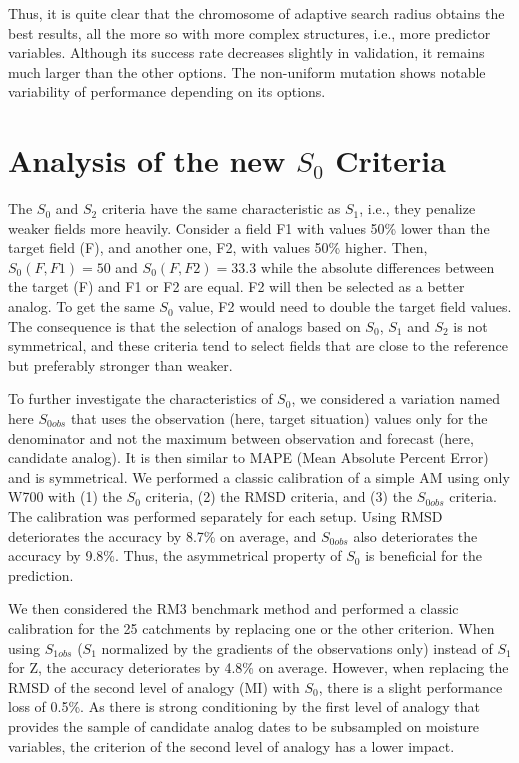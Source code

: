 \documentclass[draft]{agujournal2019}
\begin{document}
Thus, it is quite clear that the chromosome of adaptive search radius obtains the best results, all the more so with more complex structures, i.e., more predictor variables. Although its success rate decreases slightly in validation, it remains much larger than the other options. The non-uniform mutation shows notable variability of performance depending on its options.

\FloatBarrier

\section{Analysis of the new $S_{0}$ Criteria}

The $S_{0}$ and $S_{2}$ criteria have the same characteristic as $S_{1}$, i.e., they penalize weaker fields more heavily. Consider a field F1 with values 50\% lower than the target field (F), and another one, F2, with values 50\% higher. Then, $S_{0}(F, F1) = 50$ and $S_{0}(F, F2) = 33.3$ while the absolute differences between the target (F) and F1 or F2 are equal. F2 will then be selected as a better analog. To get the same $S_{0}$ value, F2 would need to double the target field values. The consequence is that the selection of analogs based on $S_{0}$, $S_{1}$ and $S_{2}$ is not symmetrical, and these criteria tend to select fields that are close to the reference but preferably stronger than weaker. 

To further investigate the characteristics of $S_{0}$, we considered a variation named here $S_{0obs}$ that uses the observation (here, target situation) values only for the denominator and not the maximum between observation and forecast (here, candidate analog). It is then similar to MAPE (Mean Absolute Percent Error) and is symmetrical. We performed a classic calibration of a simple AM using only W700 with (1) the $S_{0}$ criteria, (2) the RMSD criteria, and (3) the $S_{0obs}$ criteria. The calibration was performed separately for each setup. Using RMSD deteriorates the accuracy by 8.7\% on average, and $S_{0obs}$ also deteriorates the accuracy by 9.8\%. Thus, the asymmetrical property of $S_{0}$ is beneficial for the prediction. 

We then considered the RM3 benchmark method and performed a classic calibration for the 25 catchments by replacing one or the other criterion. When using $S_{1obs}$ ($S_{1}$ normalized by the gradients of the observations only) instead of $S_{1}$ for Z, the accuracy deteriorates by 4.8\% on average. However, when replacing the RMSD of the second level of analogy (MI) with $S_{0}$, there is a slight performance loss of 0.5\%. As there is strong conditioning by the first level of analogy that provides the sample of candidate analog dates to be subsampled on moisture variables, the criterion of the second level of analogy has a lower impact.
\end{document}
